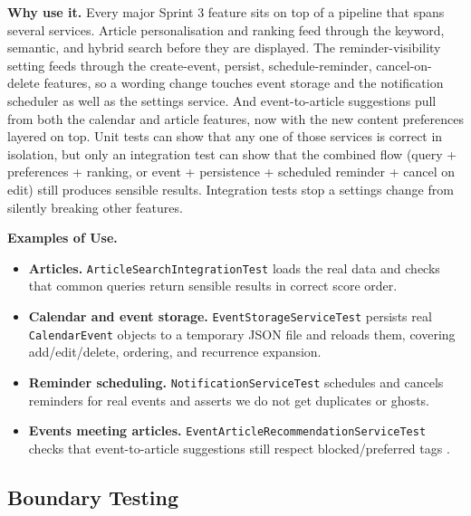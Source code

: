 \documentclass[a4paper, 12pt]{article}
\begin{document}
    \textbf{Why use it.} Every major Sprint 3 feature sits on top of a pipeline that
    spans several services. Article personalisation and ranking feed through the
    keyword, semantic, and hybrid search before they are displayed. The reminder-visibility
    setting feeds through the create-event, persist, schedule-reminder, cancel-on-delete
    features, so a wording change touches event storage and the notification scheduler
    as well as the settings service. And event-to-article suggestions pull from
    both the calendar and article features, now with the new content preferences
    layered on top. Unit tests can show that any one of those services is
    correct in isolation, but only an integration test can show that the combined
    flow (query + preferences + ranking, or event + persistence + scheduled reminder
    + cancel on edit) still produces sensible results. Integration tests stop a settings
    change from silently breaking other features.

    \textbf{Examples of Use.}

    \begin{itemize}
        \item \textbf{Articles.} \texttt{ArticleSearchIntegrationTest} loads the
            real data and checks that common queries return sensible results in correct
            score order.

        \item \textbf{Calendar and event storage.} \texttt{EventStorageServiceTest}
            persists real \texttt{CalendarEvent} objects to a temporary JSON
            file and reloads them, covering add/edit/delete, ordering, and recurrence
            expansion.

        \item \textbf{Reminder scheduling.} \texttt{NotificationServiceTest} schedules
            and cancels reminders for real events and asserts we do not get duplicates
            or ghosts.

        \item \textbf{Events meeting articles.} \texttt{EventArticleRecommendationServiceTest}
            checks that event-to-article suggestions still respect blocked/preferred
            tags .
    \end{itemize}

    \subsection{Boundary Testing}
\end{document}
